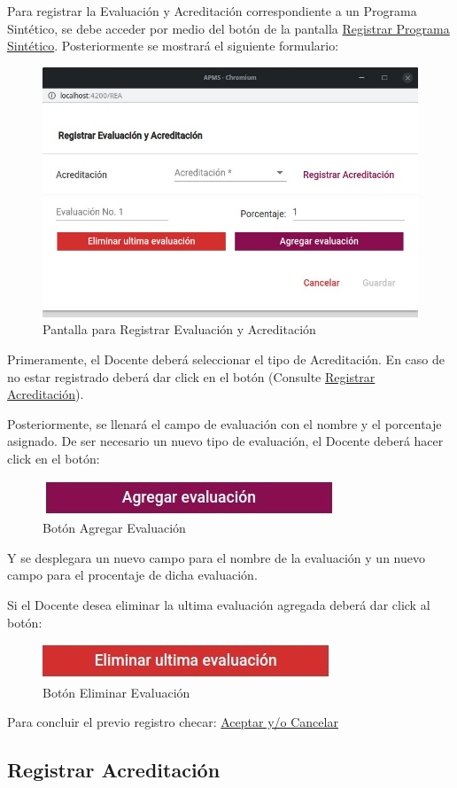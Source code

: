 Para registrar la Evaluación y Acreditación correspondiente a un Programa Sintético, se debe acceder por medio del botón  de la pantalla \hyperlink{RegistrarPS}{Registrar Programa Sintético}. Posteriormente se mostrará el siguiente formulario: 


\begin{figure}[!h]
    \centering
    \hypertarget{RegEyA}{\includegraphics[width=0.5\linewidth]{images/SP6/8.jpeg}}
    \caption{Pantalla para Registrar Evaluación y Acreditación}
\end{figure}

Primeramente, el Docente deberá seleccionar el tipo de Acreditación. En caso de no estar registrado deberá dar click en el botón (Consulte \hyperlink{RegA}{Registrar Acreditación}).

Posteriormente, se llenará el campo de evaluación con el nombre y el porcentaje asignado. De ser necesario un nuevo tipo de evaluación, el Docente deberá hacer click en el botón:

\begin{figure}[!h]
    \centering
    \includegraphics[width=0.3\linewidth]{images/SP6/BotonEval.jpeg}
    \caption{Botón Agregar Evaluación} 
\end{figure}

Y se desplegara un nuevo campo para el nombre de la evaluación y un nuevo campo para el procentaje de dicha evaluación.

Si el Docente desea eliminar la ultima evaluación agregada deberá dar click al botón: 


\begin{figure}[!h]
    \centering
    \includegraphics[width=0.3\linewidth]{images/SP6/BotonEliEval.jpeg}
    \caption{Botón Eliminar Evaluación} 
\end{figure}
Para concluir el previo registro checar: 
\hyperlink{AceptarCancelar}{Aceptar y/o Cancelar}
\pagebreak
\hypertarget{RegA}{\subsection{Registrar Acreditación}}

